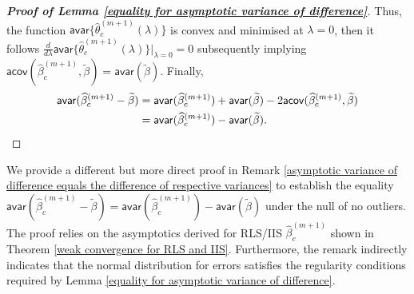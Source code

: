 \documentclass[11pt, letterpaper]{article}
\numberwithin{algorithm}{section}
\numberwithin{assumption}{section}
\numberwithin{lemma}{section}
\numberwithin{theorem}{section}
\numberwithin{corollary}{section}
\numberwithin{remark}{section}
\numberwithin{equation}{section}
\numberwithin{figure}{section}
\numberwithin{table}{section}
\begin{document}
\begin{proof}[\textnormal{\textbf{Proof of Lemma \ref{equality for asymptotic variance of difference}}}]
Thus, the function $\mathsf{avar} \{ \widehat{\theta}_{c}^{(m + 1)}(\lambda) \}$ is convex and minimised at $\lambda = 0$, then it follows $\frac{d}{d \lambda} \mathsf{avar} \{ \widehat{\theta}_{c}^{(m + 1)}(\lambda) \} |_{\lambda = 0} = 0$ subsequently implying $\mathsf{acov} (\widehat{\beta}_{c}^{(m + 1)}, \widetilde{\beta}) = \mathsf{avar} (\widetilde{\beta})$. Finally,
\begin{align*}
\mathsf{avar} (\widehat{\beta}_{c}^{(m + 1)} - \widetilde{\beta}) & =  \mathsf{avar} (\widehat{\beta}_{c}^{(m + 1)}) + \mathsf{avar} (\widetilde{\beta}) -2 \mathsf{acov} (\widehat{\beta}_{c}^{(m + 1)}, \widetilde{\beta}) \\
& =  \mathsf{avar} (\widehat{\beta}_{c}^{(m + 1)}) - \mathsf{avar} (\widetilde{\beta}). \qedhere
\end{align*}
\end{proof}

We provide a different but more direct proof in Remark \ref{asymptotic variance of difference equals the difference of respective variances} to establish the equality $\mathsf{avar}(\widehat{\beta}_{c}^{(m + 1)} - \widetilde{\beta}) = \mathsf{avar}(\widehat{\beta}_{c}^{(m + 1)}) - \mathsf{avar}(\widetilde{\beta})$ under the null of no outliers. The proof relies on the asymptotics derived for RLS/IIS $\widehat{\beta}_{c}^{(m + 1)}$ shown in Theorem \ref{weak convergence for RLS and IIS}. Furthermore, the remark indirectly indicates that the normal distribution for errors satisfies the regularity conditions required by Lemma \ref{equality for asymptotic variance of difference}.
\end{document}
